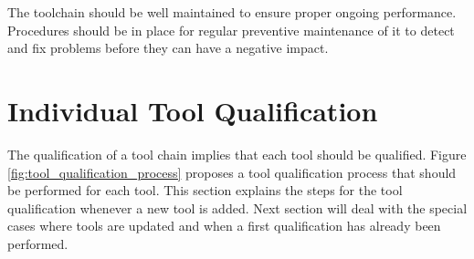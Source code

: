 The toolchain should be well maintained to ensure proper ongoing performance. Procedures should be in place for regular preventive maintenance of it to detect and fix problems before they can have a negative impact.

\section{Individual Tool Qualification}
\label{sec:individual-tool-qualif}
The qualification of a tool chain implies that each tool should be
qualified. Figure \ref{fig:tool_qualification_process} proposes a tool
qualification process that should be performed for each tool.
This section explains the steps for the tool qualification whenever a
new tool is added. Next section will deal with the special cases where tools are
updated and when a first qualification has already been performed.

